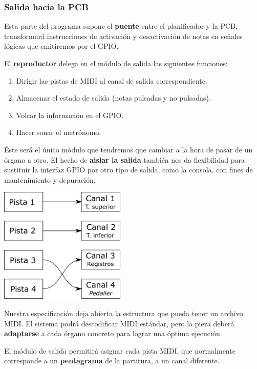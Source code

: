 \documentclass[10pt,a4paper]{article}
\begin{document}
	\subsubsection*{Salida hacia la PCB}
	
	Esta parte del programa supone el \textbf{puente} entre el planificador y la PCB, transformará instrucciones de activación y desactivación de notas en señales lógicas que emitiremos por el GPIO. 
	
	El \textbf{reproductor} delega en el módulo de salida las siguientes funciones:
	
	\begin{enumerate}
		\item Dirigir las pistas de MIDI al canal de salida correspondiente.
		\item Almacenar el estado de salida (notas pulsadas y no pulsadas).
		\item Volcar la información en el GPIO.
		\item Hacer sonar el metrónomo.
	\end{enumerate}
	
	Éste será el único módulo que tendremos que cambiar a la hora de pasar de un órgano a otro. El hecho de \textbf{aislar la salida} también nos da flexibilidad para sustituir la interfaz GPIO por otro tipo de salida, como la consola, con fines de mantenimiento y depuración.
	
	\begin{multicols}{2}
		\noindent
		\begin{center}
			\includegraphics[width=0.45\textwidth]{images/map} 
		\end{center}
		\columnbreak
		Nuestra especificación deja abierta la estructura que pueda tener un archivo MIDI. El sistema podrá descodificar MIDI estándar, pero la pieza deberá \textbf{adaptarse} a cada órgano concreto para lograr una óptima ejecución.
		
		El módulo de salida permitirá asignar cada pista MIDI, que normalmente corresponde a un \textbf{pentagrama} de la partitura, a un canal diferente.
	\end{multicols}
	
\end{document}
